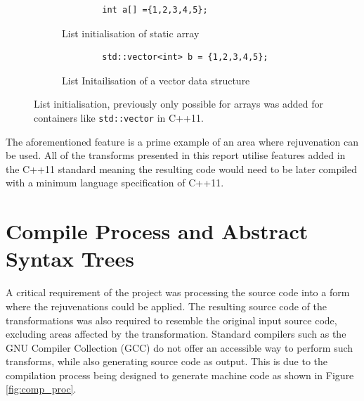 \documentclass[bsc,frontabs,singlespacing,twoside,parskip,deptreport]{infthesis}
\begin{document}
\begin{figure}[H]
    \centering
    \begin{subfigure}[b]{0.5\textwidth}
        \begin{verbatim}
        int a[] ={1,2,3,4,5};
        \end{verbatim}
        \caption{List initialisation of static array}
        \vspace{0.2cm}
        \label{fig:vec-list-a}
    \end{subfigure}
    
    \begin{subfigure}[b]{0.5\textwidth}
        \begin{verbatim}
        std::vector<int> b = {1,2,3,4,5};
        \end{verbatim}
        \caption{List Initailisation of a vector data structure}
        \label{fig:vec-list-b}
    \end{subfigure}
    
    \caption{List initialisation, previously only possible for arrays was added for containers like \texttt{std::vector} in C++11.}
    \label{fig:vec-list}
\end{figure}

The aforementioned feature is a prime example of an area where rejuvenation can be used. All of the transforms presented in this report utilise features added in the C++11 standard meaning the resulting code would need to be later compiled with a minimum language specification of C++11. 


\section{Compile Process and Abstract Syntax Trees}
A critical requirement of the project was processing the source code into a form where the rejuvenations could be applied. The resulting source code of the transformations was also required to resemble the original input source code, excluding areas affected by the transformation. Standard compilers such as the GNU Compiler Collection (GCC) \cite{GCC} do not offer an accessible way to perform such transforms, while also generating source code as output. This is due to the compilation process being designed to generate machine code as shown in Figure \ref{fig:comp_proc}.
\end{document}
